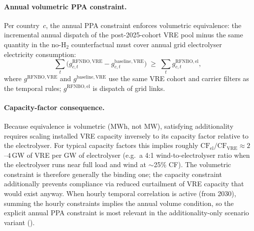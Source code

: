 \documentclass{article}
\newcommand{\code}[1]{{\ttfamily\seqsplit{#1}}}
\begin{document}
\paragraph{Annual volumetric PPA constraint.} Per country~$c$, the annual PPA constraint enforces volumetric equivalence: the incremental annual dispatch of the post-2025-cohort VRE pool minus the same quantity in the no-H$_2$ counterfactual must cover annual grid electrolyser electricity consumption:
\[
\sum_t \bigl(g_{c,t}^{\mathrm{RFNBO,VRE}} - g_{c,t}^{\mathrm{baseline,VRE}}\bigr)
\;\geq\;
\sum_t g_{c,t}^{\mathrm{RFNBO,el}},
\]
where $g^{\mathrm{RFNBO,VRE}}$ and $g^{\mathrm{baseline,VRE}}$ use the same VRE cohort and carrier filters as the temporal rules; $g^{\mathrm{RFNBO,el}}$ is dispatch of grid \code{H2 Electrolysis} links.

\paragraph{Capacity-factor consequence.} Because equivalence is volumetric (MWh, not MW), satisfying additionality requires scaling installed VRE capacity inversely to its capacity factor relative to the electrolyser. For typical capacity factors this implies roughly $\mathrm{CF}_{\mathrm{el}}/\mathrm{CF}_{\mathrm{VRE}} \approx 2$--$4$\,GW of VRE per GW of electrolyser (e.g.\ a 4:1 wind-to-electrolyser ratio when the electrolyser runs near full load and wind at $\sim$25\% CF). The volumetric constraint is therefore generally the binding one; the capacity constraint additionally prevents compliance via reduced curtailment of VRE capacity that would exist anyway. When hourly temporal correlation is active (from 2030), summing the hourly constraints implies the annual volume condition, so the explicit annual PPA constraint is most relevant in the additionality-only scenario variant (\code{RFNBO\_Add}).

\vspace{1cm}
\end{document}
